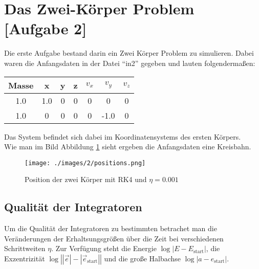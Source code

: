 \section{Das Zwei-Körper Problem [Aufgabe 2]}
Die erste Aufgabe bestand darin ein Zwei Körper Problem zu simulieren.
Dabei waren die Anfangsdaten in der Datei ``in2'' gegeben und lauten folgendermaßen:
\newline\newline
\begin{center}
\begin{tabular}{c|ccc|ccc}
  Masse & x & y & z & $v_x$ & $v_y$ & $v_z$ \\
  \hline
  1.0 & 1.0 & 0 & 0    & 0 & 0 & 0 \\
  1.0 & 0 & 0 & 0    & 0 & -1.0 & 0 \\
\end{tabular}
\end{center}
Das System befindet sich dabei im Koordinatensystems des ersten Körpers.\\
Wie man im Bild Abbildung \ref{fig:2body:rk4:positions} sieht ergeben die Anfangsdaten
eine Kreisbahn.\newline
\begin{figure}
  \centering
  \texttt{[image: ./images/2/positions.png]}
  \label{fig:2body:rk4:positions}
  \caption{Position der zwei Körper mit RK4 und $\eta = 0.001$}
\end{figure}
\newline
\subsection{Qualität der Integratoren}
Um die Qualität der Integratoren zu bestimmten betrachet man die Veränderungen
der Erhaltsungsgrößen über die Zeit bei verschiedenen Schrittweiten $\eta$.
Zur Verfügung steht die Energie $\log\left| E - E_{\text{start}} \right|$,
die Exzentrizität $\log\left|\left|\vec e\right| - \left|\vec{e}_\text{start}\right| \right|$
und die große Halbachse $\log \left| a - e_{\text{start}} \right|$.


